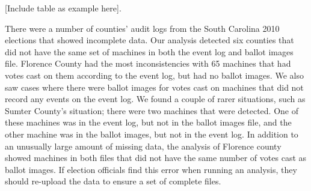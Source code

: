 [Include table as example here].

There were a number of counties' audit logs from the South Carolina 2010 elections that showed incomplete data.  Our analysis detected six counties that did not have the same set of machines in both the event log and ballot images file.  Florence County had the most inconsistencies with 65 machines that had votes cast on them according to the event log, but had no ballot images.  We also saw cases where there were ballot images for votes cast on machines that did not record any events on the event log.  We found a couple of rarer situations, such as Sumter County's situation; there were two machines that were detected.  One of these machines was in the event log, but not in the ballot images file, and the other machine was in the ballot images, but not in the event log.  In addition to an unusually large amount of missing data, the analysis of Florence county showed machines in both files that did not have the same number of votes cast as ballot images.  If election officials find this error when running an analysis,  they should re-upload the data to ensure a set of complete files.
